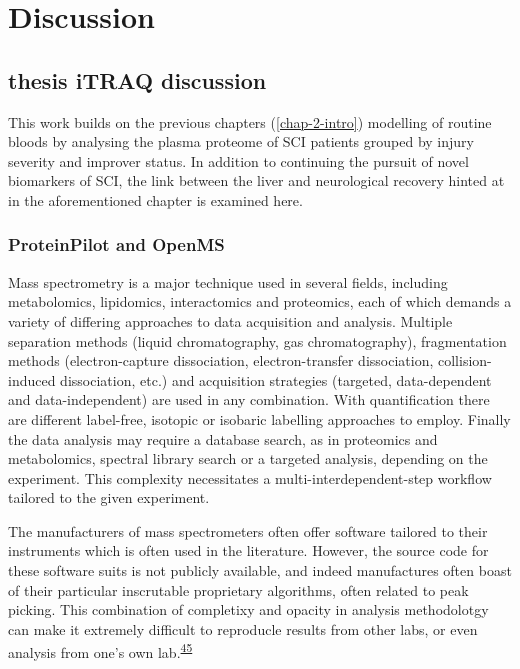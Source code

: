 \documentclass[
]{article}
\begin{document}
\hypertarget{discussion}{%
\section{Discussion}\label{discussion}}

\hypertarget{thesis-itraq-discussion}{%
\subsection{thesis iTRAQ discussion}\label{thesis-itraq-discussion}}

This work builds on the previous chapters (\ref{chap-2-intro}) modelling of routine bloods by analysing the plasma proteome of SCI patients grouped by injury severity and improver status.
In addition to continuing the pursuit of novel biomarkers of SCI, the link between the liver and neurological recovery hinted at in the aforementioned chapter is examined here.

\hypertarget{proteinpilot-and-openms}{%
\subsubsection{ProteinPilot and OpenMS}\label{proteinpilot-and-openms}}

Mass spectrometry is a major technique used in several fields, including metabolomics, lipidomics, interactomics and proteomics, each of which demands a variety of differing approaches to data acquisition and analysis.
Multiple separation methods (liquid chromatography, gas chromatography), fragmentation methods (electron-capture dissociation, electron-transfer dissociation, collision-induced dissociation, etc.) and acquisition strategies (targeted, data-dependent and data-independent) are used in any combination.
With quantification there are different label-free, isotopic or isobaric labelling approaches to employ.
Finally the data analysis may require a database search, as in proteomics and metabolomics, spectral library search or a targeted analysis, depending on the experiment.
This complexity necessitates a multi-interdependent-step workflow tailored to the given experiment.

The manufacturers of mass spectrometers often offer software tailored to their instruments which is often used in the literature.
However, the source code for these software suits is not publicly available, and indeed manufactures often boast of their particular inscrutable proprietary algorithms, often related to peak picking.
This combination of completixy and opacity in analysis methodolotgy can make it extremely difficult to reproducle results from other labs, or even analysis from one's own lab.\textsuperscript{\protect\hyperlink{ref-noauthor_devil_2011}{45}}
\end{document}
